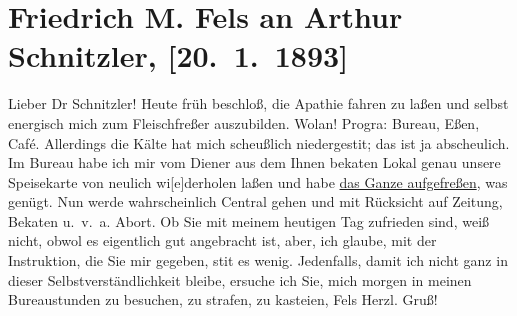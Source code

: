 

               \section[Friedrich M. Fels an Arthur Schnitzler, {[}20. 1. 1893{]}]{ Friedrich M. Fels an Arthur Schnitzler, {[}20. 1. 1893{]}}\nopagebreak{}\rehead{ }\begin{ledgroupsized}[t]{13cm}\normalsize\beginnumbering{} \toendnotes[C]{\smallbreak\pagebreak[2]} 
\toendnotes[C]{\smallbreak}\pstart
           \noindent{}{\pb}Lieber Dr Schnitzler! Heute früh beschloß, die Apathie fahren
                    zu laßen und selbst energisch mich zum Fleischfreßer auszubilden. Wolan!
                        Progra{\geminationm}: Bureau, Eßen, Café. Allerdings die
                    Kälte hat mich scheußlich niedergesti{\geminationm}t; das ist
                    ja abscheulich. Im Bureau habe ich mir vom Diener aus dem Ihnen beka{\geminationn}ten Lokal genau unsere Speisekarte von neulich
                        wi{[}e{]}derholen laßen und habe \uline{das Ganze aufgefreßen}, was genügt. Nun werde wahrscheinlich
                        Central gehen und mit Rücksicht auf
                    Zeitung, Beka{\geminationn}ten u. v. a. Abort.\pend
           \pstart
           Ob Sie mit meinem heutigen Tag zufrieden sind, weiß \label{T_L00160_1v}\label{T_L00160_1h} nicht, obwol es
                    eigentlich \introOben{}gut\introOben{} angebracht ist, aber, ich glaube, mit
                    der Instruktion, die Sie mir gegeben, sti{\geminationm}t es
                    wenig.\pend
           \pstart
           Jedenfalls, damit ich nicht ganz in dieser Selbstverständlichkeit bleibe, ersuche
                    ich Sie, mich morgen in meinen Bureaustunden zu besuchen, zu strafen, zu
                    kasteien,\pend
           \pstart \spacefill\mbox{Fels}\pend{}\pstart
           \noindent{}Herzl. Gruß!\pend
                     \endnumbering{}\end{ledgroupsized}  \newcommand{\dateiname}{L00160}\newcommand{\titel}{Friedrich M. Fels an Arthur Schnitzler, [20. 1. 1893]}\newcommand{\editorInnen}{Martin Anton Müller und Gerd-Hermann Susen}
            \footnotesize
\begin{ledgroupsized}[t]{11.5cm}
\end{ledgroupsized}
         
      